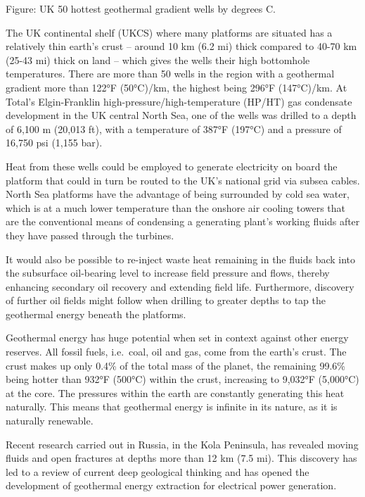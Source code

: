 \documentclass[
]{book}
\begin{document}
Figure: UK 50 hottest geothermal gradient wells by degrees C.

The UK continental shelf (UKCS) where many platforms are situated has a relatively thin earth's crust -- around 10 km (6.2 mi) thick compared to 40-70 km (25-43 mi) thick on land -- which gives the wells their high bottomhole temperatures. There are more than 50 wells in the region with a geothermal gradient more than 122°F (50°C)/km, the highest being 296°F (147°C)/km. At Total's Elgin-Franklin high-pressure/high-temperature (HP/HT) gas condensate development in the UK central North Sea, one of the wells was drilled to a depth of 6,100 m (20,013 ft), with a temperature of 387°F (197°C) and a pressure of 16,750 psi (1,155 bar).

Heat from these wells could be employed to generate electricity on board the platform that could in turn be routed to the UK's national grid via subsea cables. North Sea platforms have the advantage of being surrounded by cold sea water, which is at a much lower temperature than the onshore air cooling towers that are the conventional means of condensing a generating plant's working fluids after they have passed through the turbines.

It would also be possible to re-inject waste heat remaining in the fluids back into the subsurface oil-bearing level to increase field pressure and flows, thereby enhancing secondary oil recovery and extending field life. Furthermore, discovery of further oil fields might follow when drilling to greater depths to tap the geothermal energy beneath the platforms.

Geothermal energy has huge potential when set in context against other energy reserves. All fossil fuels, i.e.~coal, oil and gas, come from the earth's crust. The crust makes up only 0.4\% of the total mass of the planet, the remaining 99.6\% being hotter than 932°F (500°C) within the crust, increasing to 9,032°F (5,000°C) at the core. The pressures within the earth are constantly generating this heat naturally. This means that geothermal energy is infinite in its nature, as it is naturally renewable.

Recent research carried out in Russia, in the Kola Peninsula, has revealed moving fluids and open fractures at depths more than 12 km (7.5 mi). This discovery has led to a review of current deep geological thinking and has opened the development of geothermal energy extraction for electrical power generation.
\end{document}
